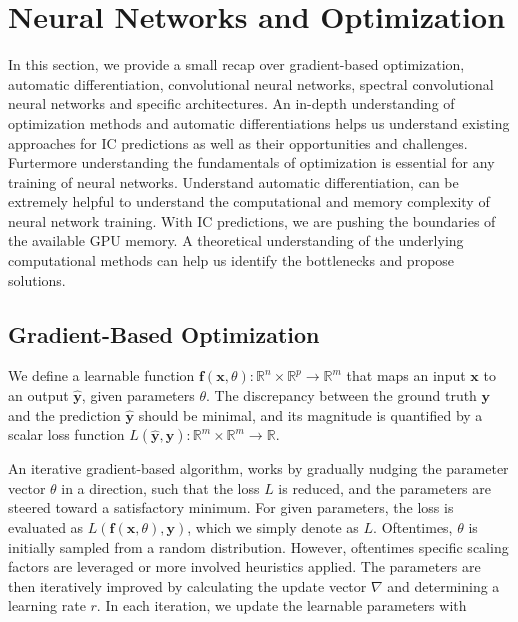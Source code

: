 \documentclass{article}
\begin{document}
\newpage
\newpage
\section{Neural Networks and Optimization}
\label{nno}

In this section, we provide a small recap over gradient-based optimization, automatic differentiation, convolutional neural networks, spectral convolutional neural networks and specific architectures. 
An in-depth understanding of optimization methods and automatic differentiations helps us understand existing approaches for IC predictions as well as their opportunities and challenges. Furtermore understanding the fundamentals of optimization is essential for any training of neural networks. Understand automatic differentiation, can be extremely helpful to understand the computational and memory complexity of neural network training. With IC predictions, we are pushing the boundaries of the available GPU memory. A theoretical understanding of the underlying computational methods can help us identify the bottlenecks and propose solutions.

\subsection{Gradient-Based Optimization}

We define a learnable function \(\mathbf{f}(\mathbf{x}, \theta) \colon \mathbb{R}^n \times \mathbb{R}^p \rightarrow \mathbb{R}^m\) that maps an input \(\mathbf{x}\) to an output \(\hat{\mathbf{y}}\), given parameters \(\theta\). The discrepancy between the ground truth \(\mathbf{y}\) and the prediction \(\hat{\mathbf{y}}\) should be minimal, and its magnitude is quantified by a scalar loss function \(L(\hat{\mathbf{y}}, \mathbf{y}) \colon \mathbb{R}^m \times \mathbb{R}^m \rightarrow \mathbb{R}\). 

An iterative gradient-based algorithm, works by gradually nudging the parameter vector $\theta$ in a direction, such that the loss $L$ is reduced, and the parameters are steered toward a satisfactory minimum. For given parameters, the loss is evaluated as $L(\mathbf{f}(\mathbf{x}, \theta), \mathbf{y})$, which we simply denote as $L$. Oftentimes, $\theta$ is initially sampled from a random distribution. However, oftentimes specific scaling factors are leveraged or more involved heuristics applied. The parameters are then iteratively improved by calculating the update vector $\nabla$ and determining a learning rate $r$. In each iteration, we update the learnable parameters with
\end{document}
